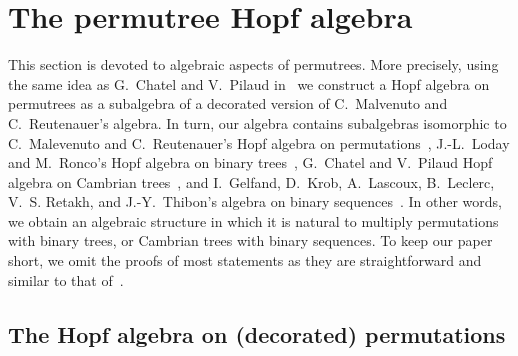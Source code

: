 \documentclass[ALCO]{cedram}
\begin{document}

\section{The permutree Hopf algebra}
\label{sec:permutreeHopfAlgebra}

This section is devoted to algebraic aspects of permutrees. More precisely, using the same idea as G.~Chatel and V.~Pilaud in~\cite{ChatelPilaud} we construct a Hopf algebra on permutrees as a subalgebra of a decorated version of C.~Malvenuto and C.~Reutenauer's algebra. In turn, our algebra contains subalgebras isomorphic to C.~Malevenuto and C.~Reutenauer's Hopf algebra on permutations~\cite{MalvenutoReutenauer}, J.-L.~Loday and M.~Ronco's Hopf algebra on binary trees~\cite{LodayRonco}, G.~Chatel and V.~Pilaud Hopf algebra on Cambrian trees~\cite{ChatelPilaud}, and I.~Gelfand, D.~Krob, A.~Lascoux, B.~Leclerc, V.~S. Retakh, and J.-Y.~Thibon's algebra on binary sequences~\cite{GelfandKrobLascouxLeclercRetakhThibon}. In other words, we obtain an algebraic structure in which it is natural to multiply permutations with binary trees, or Cambrian trees with binary sequences. To keep our paper short, we omit the proofs of most statements as they are straightforward and similar to that of~\cite[Section~1.2]{ChatelPilaud}.


\subsection{The Hopf algebra on (decorated) permutations}
\label{subsec:decoratedMRAlgebra}
\end{document}
